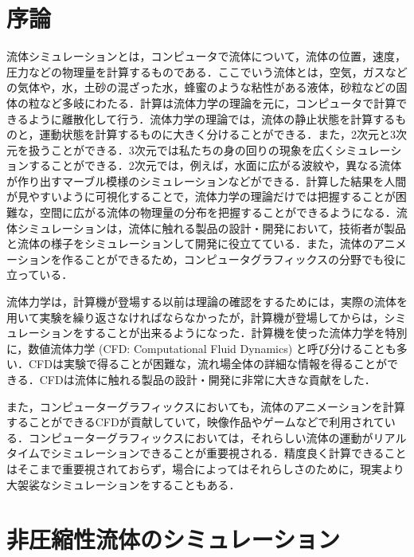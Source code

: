 \documentclass[a4j,12pt]{jreport}
\begin{document}
\tableofcontents


\newpage
{}



\chapter{序論} \label{chapter:2}

流体シミュレーションとは，コンピュータで流体について，流体の位置，速度，圧力などの物理量を計算するものである．ここでいう流体とは，空気，ガスなどの気体や，水，土砂の混ざった水，蜂蜜のような粘性がある液体，砂粒などの固体の粒など多岐にわたる．計算は流体力学の理論を元に，コンピュータで計算できるように離散化して行う．流体力学の理論では，流体の静止状態を計算するものと，運動状態を計算するものに大きく分けることができる．また，2次元と3次元を扱うことができる．3次元では私たちの身の回りの現象を広くシミュレーションすることができる．2次元では，例えば，水面に広がる波紋や，異なる流体が作り出すマーブル模様のシミュレーションなどができる．計算した結果を人間が見やすいように可視化することで，流体力学の理論だけでは把握することが困難な，空間に広がる流体の物理量の分布を把握することができるようになる．流体シミュレーションは，流体に触れる製品の設計・開発において，技術者が製品と流体の様子をシミュレーションして開発に役立てている．また，流体のアニメーションを作ることができるため，コンピュータグラフィックスの分野でも役に立っている．

流体力学は，計算機が登場する以前は理論の確認をするためには，実際の流体を用いて実験を繰り返さなければならなかったが，計算機が登場してからは，シミュレーションをすることが出来るようになった．計算機を使った流体力学を特別に，数値流体力学 (CFD: Computational Fluid Dynamics) と呼び分けることも多い．CFDは実験で得ることが困難な，流れ場全体の詳細な情報を得ることができる．CFDは流体に触れる製品の設計・開発に非常に大きな貢献をした．

また，コンピューターグラフィックスにおいても，流体のアニメーションを計算することができるCFDが貢献していて，映像作品やゲームなどで利用されている．コンピューターグラフィックスにおいては，それらしい流体の運動がリアルタイムでシミュレーションできることが重要視される．精度良く計算できることはそこまで重要視されておらず，場合によってはそれらしさのために，現実より大袈裟なシミュレーションをすることもある．
\chapter{非圧縮性流体のシミュレーション} \label{chapter:3}
\end{document}
